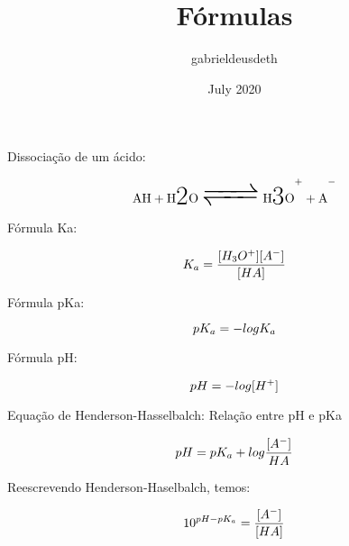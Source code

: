 \documentclass{article}
\title{Fórmulas}
\author{gabrieldeusdeth}
\date{July 2020}
\begin{document}
\maketitle

Dissociação de um ácido:

\begin{equation}
    \Huge\ce{ AH + H2O <=> H3O^+ + A^- }    
\end{equation}

Fórmula Ka:

\begin{equation}
    \Huge K_a = \frac{[H_3O^+] [A^-]}{[HA]}
\end{equation}

Fórmula pKa:

\begin{equation}
    \Huge pK_a = -logK_a
\end{equation}

Fórmula pH:

\begin{equation}
    \Huge pH = -log[H^+]
\end{equation}

Equação de Henderson-Hasselbalch: Relação entre pH e pKa 

\begin{equation}
    \Huge pH = pK_a + log\frac{[A^-]}{HA}
\end{equation}

Reescrevendo Henderson-Haselbalch, temos:

\begin{equation}
    \Huge 10^{pH-pK_a} = \frac{[A^-]}{[HA]}
\end{equation}
\end{document}
